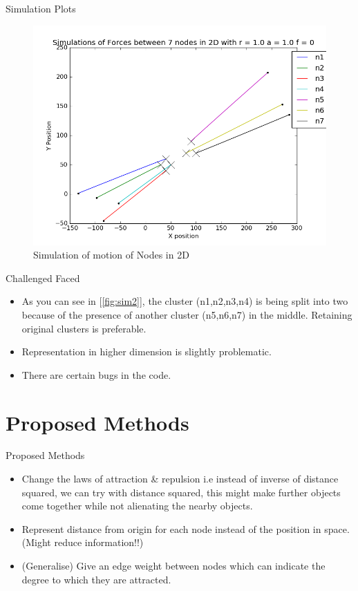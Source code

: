 \documentclass{beamer}
\begin{document}
\begin{frame}{Simulation Plots}

\begin{figure}[H]
\label{fig:sim3}
  \includegraphics[scale=0.45]{output3.png}
\caption{Simulation of motion of Nodes in 2D}
\end{figure}


\end{frame}

\begin{frame}{Challenged Faced}

\begin{itemize}
    \item As you can see in [\textcolor{blue}{\ref{fig:sim2}}], the cluster (n1,n2,n3,n4) is being split into two because of the presence of another cluster (n5,n6,n7) in the middle. Retaining original clusters is preferable.
    \item Representation in higher dimension is slightly problematic.
    \item There are certain bugs in the code. 
\end{itemize}


\end{frame}


\section{Proposed Methods}
\begin{frame}{Proposed Methods}{}
 \begin{itemize}
     \item Change the laws of attraction \& repulsion i.e instead of inverse of distance squared, we can try with distance squared, this might make further objects come together while not alienating the nearby objects.
     \item Represent distance from origin for each node instead of the position in space. (Might reduce information!!)
     \item (Generalise) Give an edge weight between nodes which can indicate the degree to which they are attracted.
 \end{itemize}
 
\end{frame}
\end{document}
